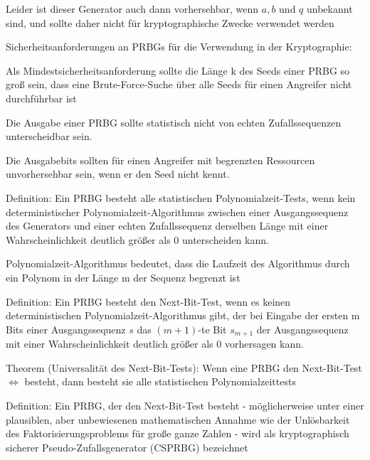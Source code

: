 \documentclass[a4paper]{article}
\begin{document}
\begin{multicols}{3}
\begin{itemize*}
\begin{itemize*}
                  \item Leider ist dieser Generator auch dann vorhersehbar, wenn $a, b$ und $q$ unbekannt sind, und sollte daher nicht für kryptographische Zwecke verwendet werden
            \end{itemize*}
            \item Sicherheitsanforderungen an PRBGs für die Verwendung in der
            Kryptographie:
            \begin{itemize*}
                  \item Als Mindestsicherheitsanforderung sollte die Länge k des Seeds einer PRBG so groß sein, dass eine Brute-Force-Suche über alle Seeds für einen Angreifer nicht durchführbar ist
                  \item Die Ausgabe einer PRBG sollte statistisch nicht von echten Zufallssequenzen unterscheidbar sein.
                  \item Die Ausgabebits sollten für einen Angreifer mit begrenzten Ressourcen unvorhersehbar sein, wenn er den Seed nicht kennt.
            \end{itemize*}
            \item Definition: Ein PRBG besteht alle statistischen Polynomialzeit-Tests,
            wenn kein deterministischer Polynomialzeit-Algorithmus zwischen einer
            Ausgangssequenz des Generators und einer echten Zufallssequenz
            derselben Länge mit einer Wahrscheinlichkeit deutlich größer als 0
            unterscheiden kann.
            \begin{itemize*}
                  \item Polynomialzeit-Algorithmus bedeutet, dass die Laufzeit des Algorithmus durch ein Polynom in der Länge m der Sequenz begrenzt ist
            \end{itemize*}
            \item Definition: Ein PRBG besteht den Next-Bit-Test, wenn es keinen
            deterministischen Polynomialzeit-Algorithmus gibt, der bei Eingabe der
            ersten m Bits einer Ausgangssequenz $s$ das $(m+1)$-te Bit
            $s_{m+1}$ der Ausgangssequenz mit einer Wahrscheinlichkeit
            deutlich größer als 0 vorhersagen kann.
            \item Theorem (Universalität des Next-Bit-Tests): Wenn eine PRBG den
            Next-Bit-Test $\Leftrightarrow$ besteht, dann besteht
            sie alle statistischen Polynomialzeittests
            \item Definition: Ein PRBG, der den Next-Bit-Test besteht - möglicherweise
            unter einer plausiblen, aber unbewiesenen mathematischen Annahme wie
            der Unlösbarkeit des Faktorisierungsproblems für große ganze Zahlen -
            wird als kryptographisch sicherer Pseudo-Zufallsgenerator (CSPRBG)
            bezeichnet
      \end{itemize*}



\end{multicols}
\end{document}
